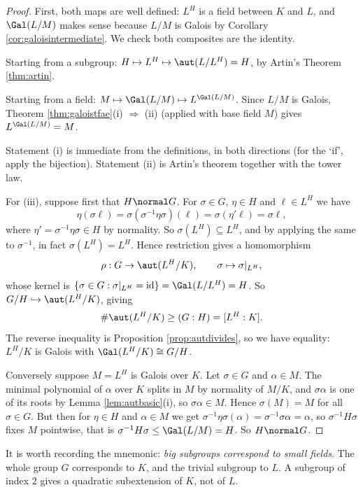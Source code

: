 \begin{proof}
	First, both maps are well defined: $L^H$ is a field between $K$ and $L$, and $\Gal(L/M)$ makes sense because $L/M$ is Galois by Corollary \ref{cor:galoisintermediate}. We check both composites are the identity.

	Starting from a subgroup: $H \mapsto L^H \mapsto \aut(L/L^H) = H$, by Artin's Theorem \ref{thm:artin}.

	Starting from a field: $M \mapsto \Gal(L/M) \mapsto L^{\Gal(L/M)}$. Since $L/M$ is Galois, Theorem \ref{thm:galoistfae}(i) $\Rightarrow$ (ii) (applied with base field $M$) gives $L^{\Gal(L/M)} = M$.

	Statement (i) is immediate from the definitions, in both directions (for the `if', apply the bijection). Statement (ii) is Artin's theorem together with the tower law.

	For (iii), suppose first that $H \normal G$. For $\sigma \in G$, $\eta \in H$ and $\ell \in L^H$ we have
	$$\eta(\sigma \ell) = \sigma(\sigma^{-1}\eta\sigma)(\ell) = \sigma(\eta'\ell) = \sigma\ell,$$
	where $\eta' = \sigma^{-1}\eta\sigma \in H$ by normality. So $\sigma(L^H) \subseteq L^H$, and by applying the same to $\sigma^{-1}$, in fact $\sigma(L^H) = L^H$. Hence restriction gives a homomorphism
	$$\rho : G \to \aut(L^H/K), \qquad \sigma \mapsto \sigma|_{L^H},$$
	whose kernel is $\{\sigma \in G : \sigma|_{L^H} = \mathrm{id}\} = \Gal(L/L^H) = H$. So $G/H \hookrightarrow \aut(L^H/K)$, giving
	$$\#\aut(L^H/K) \geq (G:H) = [L^H:K].$$
	The reverse inequality is Proposition \ref{prop:autdivides}, so we have equality: $L^H/K$ is Galois with $\Gal(L^H/K) \cong G/H$.

	Conversely suppose $M = L^H$ is Galois over $K$. Let $\sigma \in G$ and $\alpha \in M$. The minimal polynomial of $\alpha$ over $K$ splits in $M$ by normality of $M/K$, and $\sigma\alpha$ is one of its roots by Lemma \ref{lem:autbasic}(i), so $\sigma\alpha \in M$. Hence $\sigma(M) = M$ for all $\sigma \in G$. But then for $\eta \in H$ and $\alpha \in M$ we get $\sigma^{-1}\eta\sigma(\alpha) = \sigma^{-1}\sigma\alpha = \alpha$, so $\sigma^{-1}H\sigma$ fixes $M$ pointwise, that is $\sigma^{-1}H\sigma \leq \Gal(L/M) = H$. So $H \normal G$.
\end{proof}

\begin{remark}
	It is worth recording the mnemonic: \emph{big subgroups correspond to small fields}. The whole group $G$ corresponds to $K$, and the trivial subgroup to $L$. A subgroup of index $2$ gives a quadratic subextension of $K$, not of $L$.
\end{remark}

